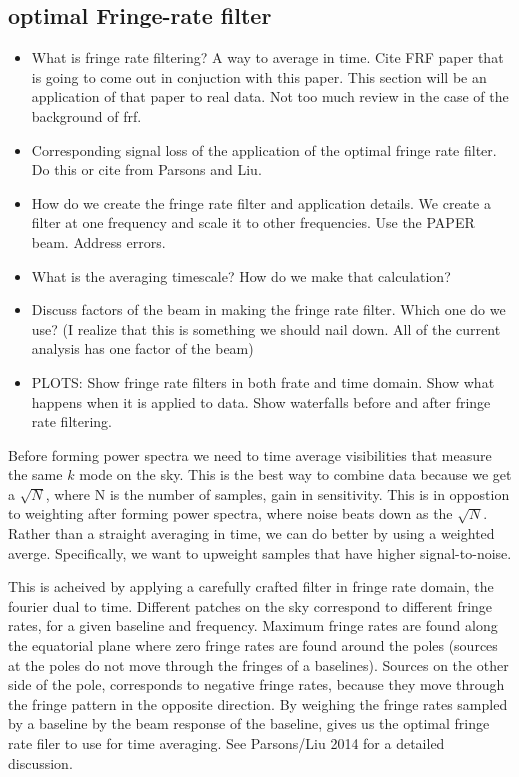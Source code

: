 \documentclass[twocolumn,numberedappendix]{emulateapj}
\begin{document}
\subsection{optimal Fringe-rate filter}
\begin{itemize}
    \item{What is fringe rate filtering? A way to average in time. Cite FRF
paper that is going to come out in conjuction with this paper. This section will
be an application of that paper to real data. Not too much review in the case of
the background of frf.}
    \item{Corresponding signal loss of the application of the optimal fringe
rate filter. Do this or cite from Parsons and Liu.} 
    \item{How do we create the fringe rate filter and application details. We
create a filter at one frequency and scale it to other frequencies. Use the
PAPER beam. Address errors.}
    \item{What is the averaging timescale? How do we make that calculation?}
    \item{Discuss factors of the beam in making the fringe rate filter. Which
one do we use? (I realize that this is something we should nail down. All of the
current analysis has one factor of the beam)}
    \item{PLOTS: Show fringe rate filters in both frate and time domain. Show
what happens when it is applied to data. Show waterfalls before and after fringe
rate filtering.}
\end{itemize}
Before forming power spectra we need to time average visibilities that measure
the same $k$ mode on the sky. This is the best way to combine data because we
get a $\sqrt{N}$, where N is the number of samples, gain in sensitivity. This is
in oppostion to weighting after forming power spectra, where noise beats down as
the $\sqrt{N}$. Rather than a straight averaging in time, we can do better by
using a weighted averge. Specifically, we want to upweight samples that have
higher signal-to-noise. 

This is acheived by applying a carefully crafted filter in fringe rate domain,
the fourier dual to time. Different patches on the sky correspond to different
fringe rates, for a given baseline and frequency. Maximum fringe rates are found
along the equatorial plane where zero fringe rates are found around the poles
(sources at the poles do not move through the fringes of a baselines). Sources
on the other side of the pole, corresponds to negative fringe rates, because
they move through the fringe pattern in the opposite direction. By weighing the
fringe rates sampled by a baseline by the beam response of the baseline, gives
us the optimal fringe rate filer to use for time averaging. See Parsons/Liu 2014
for a detailed discussion.
\end{document}
